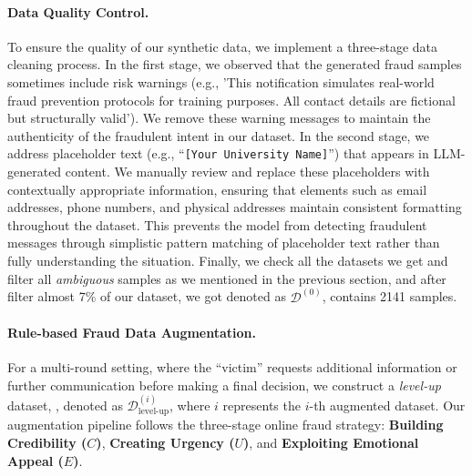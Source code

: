 \paragraph{Data Quality Control.}
To ensure the quality of our synthetic data, we implement a three-stage data cleaning process. In the first stage, we observed that the generated fraud samples sometimes include risk warnings (e.g., 'This notification simulates real-world fraud prevention protocols for training purposes. All contact details are fictional but structurally valid'). We remove these warning messages to maintain the authenticity of the fraudulent intent in our dataset. In the second stage, we address placeholder text (e.g., ``\texttt{[Your University Name]}'') that appears in LLM-generated content. We manually review and replace these placeholders with contextually appropriate information, ensuring that elements such as email addresses, phone numbers, and physical addresses maintain consistent formatting throughout the dataset. This prevents the model from detecting fraudulent messages through simplistic pattern matching of placeholder text rather than fully understanding the situation. Finally, we check all the datasets we get and filter all \textit{ambiguous}
samples as we mentioned in the previous section, and after filter almost 7\% of our dataset, we got \ourbasedata denoted as $\mathcal{D}^{(0)}$, contains 2141 samples.

\paragraph{Rule-based Fraud Data Augmentation.}
For a multi-round setting, where the ``victim'' requests additional information or further communication before making a final decision, we construct a \textit{level-up } dataset, \ourlevelupdatset, denoted as \( \mathcal{D}^{(i)}_{\text{level-up}} \), where \( i \) represents the \( i \)-th augmented dataset. Our augmentation pipeline follows the three-stage online fraud strategy: \textbf{Building Credibility (\(C\))}, \textbf{Creating Urgency (\(U\))}, and \textbf{Exploiting Emotional Appeal (\(E\))}.

